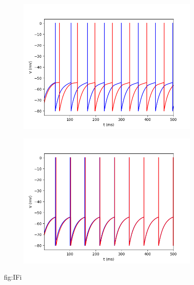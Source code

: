\documentclass{article}
\begin{document}
\begin{figure}[h]
	\centering
	\begin{subfigure}[t]{0.45\linewidth}
		\centering
		\includegraphics[width = 1.0\linewidth, trim={0 0 0 0}, clip=true]{V_74i.png}
		\label{fig:V74}	
	\end{subfigure}%
	\hspace{0.05\linewidth}
	\begin{subfigure}[t]{0.45\linewidth}
		\centering
		\includegraphics[width = 1.0\linewidth, trim={0 0 0 0}, clip=true]{V_72i.png}
		\label{fig:V72}	
	\end{subfigure}%
\caption{fig:IFi}
\end{figure}
\end{document}
